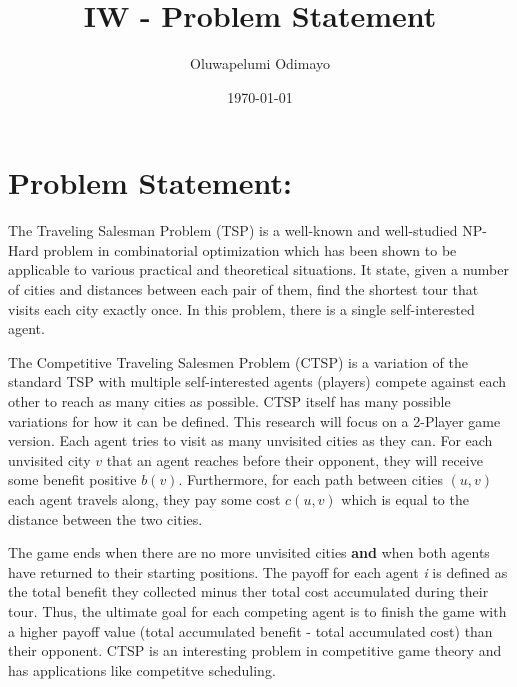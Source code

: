 \documentclass[12pt]{article}%
\begin{document}
	
	\title{IW - Problem Statement} %
	\date{\today}
	\author{Oluwapelumi Odimayo} %
	\maketitle
	
	\section*{Problem Statement:}
	
	The Traveling Salesman Problem (TSP) is a well-known and well-studied NP-Hard problem in combinatorial optimization which has been shown to be applicable to various practical  and theoretical situations. It state, given a number of cities and distances between each pair of them, find the shortest tour that visits each city exactly once. In this problem, there is a single self-interested agent.\par 
	The Competitive Traveling Salesmen Problem (CTSP) is a variation of the standard TSP with multiple self-interested agents (players) compete against each other to reach as many cities as possible. CTSP itself has many possible variations for how it can be defined. This research will focus on a 2-Player game version. Each agent tries to visit as many unvisited cities as they can. For each unvisited city $v$ that an agent reaches before their opponent, they will receive some benefit positive $b(v)$. Furthermore, for each path between cities $(u,v)$ each agent travels along, they pay some cost $c(u,v)$ which is equal to the distance between the two cities.\par
	The game ends when there are no more unvisited cities \textbf{and} when both agents have returned to their starting positions. The payoff for each agent \textit{i} is defined as the total benefit they collected minus ther total cost accumulated during their tour. Thus, the ultimate goal for each competing agent is to finish the game with a higher payoff value (total accumulated benefit - total accumulated cost) than their opponent. CTSP is an interesting problem in competitive game theory and has applications like competitve scheduling.\par
\end{document}
